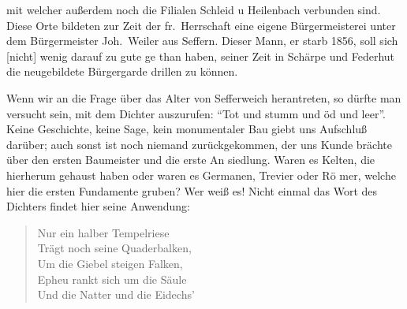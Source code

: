 

%
mit welcher außerdem noch die Filialen Schleid u\ob
Heilenbach verbunden sind. Diese Orte bildeten zur\ob
Zeit der fr.\ Herrschaft eine eigene Bürgermeisterei unter\ob
dem Bürgermeister Joh.\ Weiler aus Seffern. Dieser\ob
Mann, er starb 1856, soll sich {[nicht]} wenig darauf zu gute ge\ohb
than haben, seiner Zeit in Schärpe und Federhut die\ob
neugebildete Bürgergarde drillen zu können.

\pend
{}
\pstart

Wenn wir an die Frage über das Alter von Sefferweich\ob
herantreten, so dürfte man versucht sein, mit dem\ob
Dichter auszurufen: \enquote{Tot und stumm und öd und leer}.\ob
Keine Geschichte, keine Sage, kein monumentaler\ob
Bau giebt uns Aufschluß darüber; auch sonst ist noch\ob
niemand zurückgekommen, der uns Kunde brächte\ob
über den ersten Baumeister und die erste An\ohb
siedlung. Waren es Kelten, die hierherum gehaust\ob
haben oder waren es Germanen, Trevier oder Rö\ohb
mer, welche hier die ersten Fundamente gruben?\ob
Wer weiß es! Nicht einmal das Wort des Dichters\ob
findet hier seine Anwendung:

\pend
\begin{verse}
Nur ein halber Tempelriese\\
Trägt noch seine Quaderbalken,\\
Um die Giebel steigen Falken,\\
Epheu rankt sich um die Säule\\
Und die Natter und die Eidechs'
\end{verse}
\pstart
\pend
